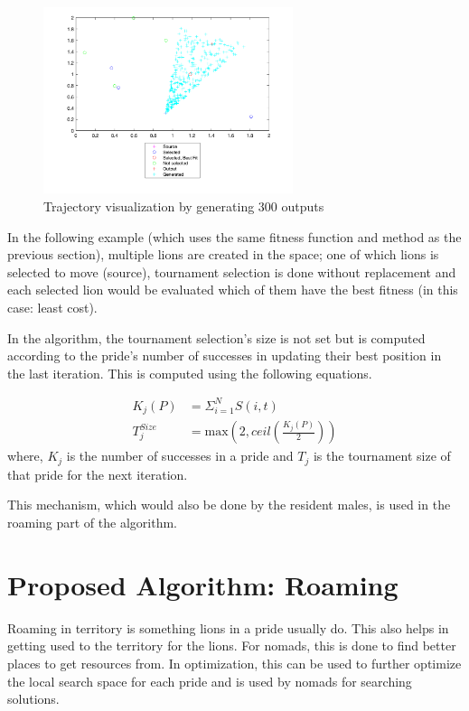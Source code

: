 \begin{figure}[h]
\begin{center}
\includegraphics[width=0.65\textwidth]{img/moving/move-out-legend}
\caption{Trajectory visualization by generating 300 outputs}
\end{center}
\end{figure}

In the following example (which uses the same fitness function and method as the previous section), multiple lions are created in the space; one of which lions is selected to move (source), tournament selection is done without replacement and each selected lion would be evaluated which of them have the best fitness (in this case: least cost).

In the algorithm, the tournament selection's size is not set but is computed according to the pride's number of successes in updating their best position in the last iteration. This is computed using the following equations.

\begin{align*}
    K_j(P) &= \Sigma_{i=1}^N  S(i,t) \\
    T_j^{Size} &= \text{max}\left(2, ceil\left(\frac{K_j(P)}{2}\right)\right)
\end{align*}
where, $K_j$ is the number of successes in a pride and $T_j$ is the tournament size of that pride for the next iteration.

This mechanism, which would also be done by the resident males, is used in the roaming part of the algorithm.

\section{Proposed Algorithm: Roaming}
Roaming in territory is something lions in a pride usually do. This also helps in getting used to the territory for the lions. For nomads, this is done to find better places to get resources from. In optimization, this can be used to further optimize the local search space for each pride and is used by nomads for searching solutions.


